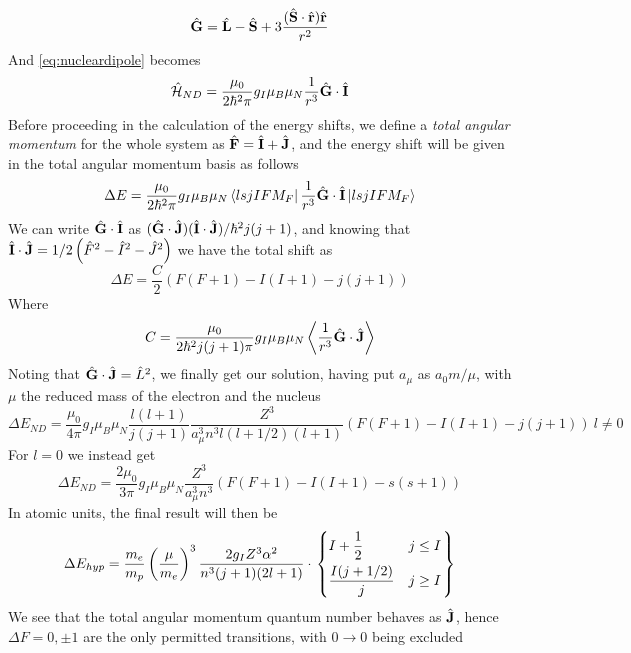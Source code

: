 \documentclass[../qm.tex]{subfiles}
\begin{document}
	\begin{equation}
		\hat{\mathbf{G}}=\hat{\mathbf{L}}-\hat{\mathbf{S}}+3\frac{(\hat{\mathbf{S}}\cdot\hat{\mathbf{r}})\hat{\mathbf{r}}}{r^2}
		\label{eq:gangularmomnuc}
	\end{equation}
	And \eqref{eq:nucleardipole} becomes
	\begin{equation}
		\hat{\mathcal{H}}_{ND}=\frac{\mu_0}{2\hbar^2\pi}g_I\mu_B\mu_N\frac{1}{r^3}\hat{\mathbf{G}}\cdot\hat{\mathbf{I}}
		\label{eq:nucleardipoleG}
	\end{equation}
	Before proceeding in the calculation of the energy shifts, we define a \textit{total angular momentum} for the whole system as $\hat{\mathbf{F}}=\hat{\mathbf{I}}+\hat{\mathbf{J}}$, and the energy shift will be given in the total angular momentum basis as follows
	\begin{equation}
		\Delta E=\frac{\mu_0}{2\hbar^2\pi}g_I\mu_B\mu_N\bra{lsjIFM_F}\frac{1}{r^3}\hat{\mathbf{G}}\cdot\hat{\mathbf{I}}\ket{lsjIFM_F}
		\label{eq:energyshiftnucmom}
	\end{equation}
	We can write $\hat{\mathbf{G}}\cdot\hat{\mathbf{I}}$ as $(\hat{\mathbf{G}}\cdot\hat{\mathbf{J}})(\hat{\mathbf{I}}\cdot\hat{\mathbf{J}})/\hbar^2j(j+1)$, and knowing that $\hat{\mathbf{I}}\cdot\hat{\mathbf{J}}=1/2\left( \hat{F}^2-\hat{I}^2-\hat{J}^2 \right)$ we have the total shift as
	\begin{equation}
		\Delta E=\frac{C}{2}\left( F(F+1)-I(I+1)-j(j+1) \right)
		\label{eq:totalenergyshiftmnd}
	\end{equation}
	Where
	\begin{equation}
		C=\frac{\mu_0}{2\hbar^2j(j+1)\pi}g_I\mu_B\mu_N\expval{\frac{1}{r^3}\hat{\mathbf{G}}\cdot\hat{\mathbf{J}}}
		\label{eq:constantmdshift}
	\end{equation}
	Noting that $\hat{\mathbf{G}}\cdot\hat{\mathbf{J}}=\hat{L}^2$, we finally get our solution, having put $a_{\mu}$ as $a_0m/\mu$, with $\mu$ the reduced mass of the electron and the nucleus
	\begin{equation}
		\Delta E_{ND}=\frac{\mu_0}{4\pi}g_I\mu_B\mu_N\frac{l(l+1)}{j(j+1)}\frac{Z^3}{a_{\mu}^3n^3l(l+1/2)(l+1)}\left( F(F+1)-I(I+1)-j(j+1) \right)\ l\ne0
		\label{eq:finalsolenuclearmom}
	\end{equation}
	For $l=0$ we instead get
	\begin{equation}
		\Delta E_{ND}=\frac{2\mu_0}{3\pi}g_I\mu_B\mu_N\frac{Z^3}{a_{\mu}^3n^3}\left( F(F+1)-I(I+1)-s(s+1) \right)
		\label{eq:l0nuclearmom}
	\end{equation}
	In atomic units, the final result will then be
	\begin{equation}
		\Delta E_{hyp}=\frac{m_e}{m_p}\left( \frac{\mu}{m_e} \right)^3\frac{2g_IZ^3\alpha^2}{n^3(j+1)(2l+1)}\cdot\left.\begin{dcases}I+\frac{1}{2}&j\le I\\
		\frac{I(j+1/2)}{j}&j\ge I\end{dcases}\right\}
		\label{eq:hyperfinetrans}
	\end{equation}
	We see that the total angular momentum quantum number behaves as $\hat{\mathbf{J}}$, hence $\Delta F=0,\pm1$ are the only permitted transitions, with $0\to0$ being excluded
\end{document}
